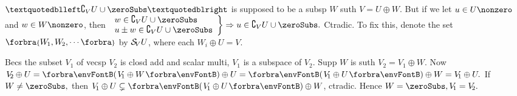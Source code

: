%

\BulletPointX{}\;\;$“\complement_V U \cup \zeroSubs”$ is supposed to be a subsp $W$ suth $V=U\oplus W$.\TextB{\vspace{3pt}}
But if we let $u\in U\nonzero$ and $w\in W\nonzero$, then $\MathRightBrace{l}{w\in\complement_V U \cup \zeroSubs\\ u\pm w\in\complement_V U \cup \zeroSubs }\Rightarrow u\in\complement_V U \cup \zeroSubs.$ Ctradic.\vspace{3pt}\TextB{}
To fix this, {\FontLarge denote the set $\Bra{W_{\hspace{-1pt}1},W_{\hspace{-1pt}2},\cdots}$ by $\mathcal{S}_{\!V}U$,} {\small where each $W_{\!i}\oplus U=V.$}
\SepLine

Becs the subset $V_{\!1}$ of vecsp $V_{\!2}$ is closd add and scalar multi, $V_{\!1}$ is a subspace of $V_{\!2}.$\parSol{}
Supp $W$ is suth $V_{\!2}=V_{\!1}\oplus W.$ Now $V_{\!2}\oplus U=\Par{V_{\!1}\oplus W}\oplus U=\Par{V_{\!1}\oplus U}\oplus W=V_{\!1}\oplus U.$\parSol{}
If $W\neq\zeroSubs,$ then $V_{\!1}\oplus U\subsetneq\Par{V_{\!1}\oplus U}\oplus W$, ctradic. Hence $W=\zeroSubs,V_{\!1}=V_{\!2}.$\PfEnd
\SepLine

